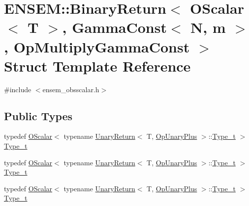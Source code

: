 \hypertarget{structENSEM_1_1BinaryReturn_3_01OScalar_3_01T_01_4_00_01GammaConst_3_01N_00_01m_01_4_00_01OpMultiplyGammaConst_01_4}{}\section{E\+N\+S\+EM\+:\+:Binary\+Return$<$ O\+Scalar$<$ T $>$, Gamma\+Const$<$ N, m $>$, Op\+Multiply\+Gamma\+Const $>$ Struct Template Reference}
\label{structENSEM_1_1BinaryReturn_3_01OScalar_3_01T_01_4_00_01GammaConst_3_01N_00_01m_01_4_00_01OpMultiplyGammaConst_01_4}


{\ttfamily \#include $<$ensem\+\_\+obsscalar.\+h$>$}

\subsection*{Public Types}
\begin{DoxyCompactItemize}
\item 
typedef \mbox{\hyperlink{classENSEM_1_1OScalar}{O\+Scalar}}$<$ typename \mbox{\hyperlink{structENSEM_1_1UnaryReturn}{Unary\+Return}}$<$ T, \mbox{\hyperlink{structENSEM_1_1OpUnaryPlus}{Op\+Unary\+Plus}} $>$\+::\mbox{\hyperlink{structENSEM_1_1BinaryReturn_3_01OScalar_3_01T_01_4_00_01GammaConst_3_01N_00_01m_01_4_00_01OpMultiplyGammaConst_01_4_a5ab97090c2ef0e27b663d6f546b03b3c}{Type\+\_\+t}} $>$ \mbox{\hyperlink{structENSEM_1_1BinaryReturn_3_01OScalar_3_01T_01_4_00_01GammaConst_3_01N_00_01m_01_4_00_01OpMultiplyGammaConst_01_4_a5ab97090c2ef0e27b663d6f546b03b3c}{Type\+\_\+t}}
\item 
typedef \mbox{\hyperlink{classENSEM_1_1OScalar}{O\+Scalar}}$<$ typename \mbox{\hyperlink{structENSEM_1_1UnaryReturn}{Unary\+Return}}$<$ T, \mbox{\hyperlink{structENSEM_1_1OpUnaryPlus}{Op\+Unary\+Plus}} $>$\+::\mbox{\hyperlink{structENSEM_1_1BinaryReturn_3_01OScalar_3_01T_01_4_00_01GammaConst_3_01N_00_01m_01_4_00_01OpMultiplyGammaConst_01_4_a5ab97090c2ef0e27b663d6f546b03b3c}{Type\+\_\+t}} $>$ \mbox{\hyperlink{structENSEM_1_1BinaryReturn_3_01OScalar_3_01T_01_4_00_01GammaConst_3_01N_00_01m_01_4_00_01OpMultiplyGammaConst_01_4_a5ab97090c2ef0e27b663d6f546b03b3c}{Type\+\_\+t}}
\item 
typedef \mbox{\hyperlink{classENSEM_1_1OScalar}{O\+Scalar}}$<$ typename \mbox{\hyperlink{structENSEM_1_1UnaryReturn}{Unary\+Return}}$<$ T, \mbox{\hyperlink{structENSEM_1_1OpUnaryPlus}{Op\+Unary\+Plus}} $>$\+::\mbox{\hyperlink{structENSEM_1_1BinaryReturn_3_01OScalar_3_01T_01_4_00_01GammaConst_3_01N_00_01m_01_4_00_01OpMultiplyGammaConst_01_4_a5ab97090c2ef0e27b663d6f546b03b3c}{Type\+\_\+t}} $>$ \mbox{\hyperlink{structENSEM_1_1BinaryReturn_3_01OScalar_3_01T_01_4_00_01GammaConst_3_01N_00_01m_01_4_00_01OpMultiplyGammaConst_01_4_a5ab97090c2ef0e27b663d6f546b03b3c}{Type\+\_\+t}}
\end{DoxyCompactItemize}


